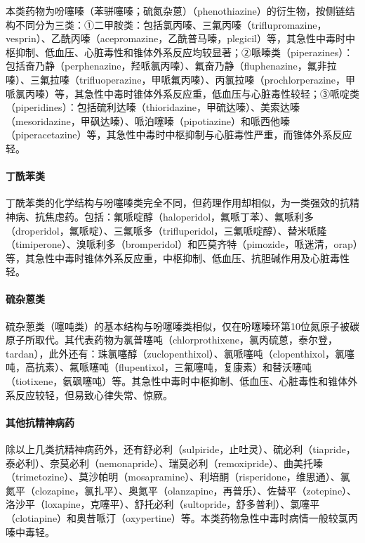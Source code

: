 本类药物为吩噻嗪（苯骈噻嗪；硫氮杂蒽）（phenothiazine）的衍生物，按侧链结构不同分为三类：①二甲胺类：包括氯丙嗪、三氟丙嗪（triflupromazine，vesprin）、乙酰丙嗪（acepromazine，乙酰普马嗪，plegicil）等，其急性中毒时中枢抑制、低血压、心脏毒性和锥体外系反应均较显著；②哌嗪类（piperazines）：包括奋乃静（perphenazine，羟哌氯丙嗪）、氟奋乃静（fluphenazine，氟非拉嗪）、三氟拉嗪（trifluoperazine，甲哌氟丙嗪）、丙氯拉嗪（prochlorperazine，甲哌氯丙嗪）等，其急性中毒时锥体外系反应重，低血压与心脏毒性较轻；③哌啶类（piperidines）：包括硫利达嗪（thioridazine，甲硫达嗪）、美索达嗪（mesoridazine，甲砜达嗪）、哌泊噻嗪（pipotiazine）和哌西他嗪（piperacetazine）等，其急性中毒时中枢抑制与心脏毒性严重，而锥体外系反应轻。

\paragraph{丁酰苯类}

丁酰苯类的化学结构与吩噻嗪类完全不同，但药理作用却相似，为一类强效的抗精神病、抗焦虑药。包括：氟哌啶醇（haloperidol，氟哌丁苯）、氟哌利多（droperidol，氟哌啶）、三氟哌多（trifluperidol，三氟哌啶醇）、替米哌隆（timiperone）、溴哌利多（bromperidol）和匹莫齐特（pimozide，哌迷清，orap）等，其急性中毒时锥体外系反应重，中枢抑制、低血压、抗胆碱作用及心脏毒性轻。

\paragraph{硫杂蒽类}

硫杂蒽类（噻吨类）的基本结构与吩噻嗪类相似，仅在吩噻嗪环第10位氮原子被碳原子所取代。其代表药物为氯普噻吨（chlorprothixene，氯丙硫蒽，泰尔登，tardan），此外还有：珠氯噻醇（zuclopenthixol）、氯哌噻吨（clopenthixol，氯噻吨，高抗素）、氟哌噻吨（flupentixol，三氟噻吨，复康素）和替沃噻吨（tiotixene，氨砜噻吨）等。其急性中毒时中枢抑制、低血压、心脏毒性和锥体外系反应较轻，但易致心律失常、惊厥。

\paragraph{其他抗精神病药}

除以上几类抗精神病药外，还有舒必利（sulpiride，止吐灵）、硫必利（tiapride，泰必利）、奈莫必利（nemonapride）、瑞莫必利（remoxipride）、曲美托嗪（trimetozine）、莫沙帕明（mosapramine）、利培酮（risperidone，维思通）、氯氮平（clozapine，氯扎平）、奥氮平（olanzapine，再普乐）、佐替平（zotepine）、洛沙平（loxapine，克噻平）、舒托必利（sultopride，舒多普利）、氯噻平（clotiapine）和奥昔哌汀（oxypertine）等。本类药物急性中毒时病情一般较氯丙嗪中毒轻。

